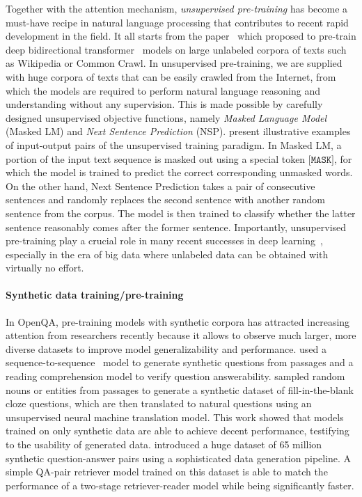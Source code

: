 %
Together with the attention mechanism, \emph{unsupervised pre-training} has become a must-have recipe in natural language processing that contributes to recent rapid development in the field.
%
It all starts from the paper~\citet{devlin2019bert} which proposed to pre-train deep bidirectional transformer~\cite{vaswani2017attention} models on large unlabeled corpora of texts such as Wikipedia or Common Crawl.
%
In unsupervised pre-training, we are supplied with huge corpora of texts that can be easily crawled from the Internet, from which the models are required to perform natural language reasoning and understanding without any supervision.
%
This is made possible by carefully designed unsupervised objective functions, namely \emph{Masked Language Model} (Masked LM) and \emph{Next Sentence Prediction} (NSP).
%
 present illustrative examples of input-output pairs of the unsupervised training paradigm.
%
In Masked LM, a portion of the input text sequence is masked out using a special token $\texttt{[MASK]}$, for which the model is trained to predict the correct corresponding unmasked words.
%
On the other hand, Next Sentence Prediction takes a pair of consecutive sentences and randomly replaces the second sentence with another random sentence from the corpus.
%
The model is then trained to classify whether the latter sentence reasonably comes after the former sentence.
%
Importantly, unsupervised pre-training play a crucial role in many recent successes in deep learning~\cite{devlin2019bert, brown2020language, caron2020unsupervised, goyal2021self}, especially in the era of big data where unlabeled data can be obtained with virtually no effort.


\paragraph{Synthetic data training/pre-training}
%
In OpenQA, pre-training models with synthetic corpora has attracted increasing attention from researchers recently because it allows to observe much larger, more diverse datasets to improve model generalizability and performance.
%
\citet{alberti2019synthetic} used a sequence-to-sequence~\cite{sutskever2014sequence} model to generate synthetic questions from passages and a reading comprehension model to verify question answerability.
%
\citet{lewis2019unsupervised} sampled random nouns or entities from passages to generate a synthetic dataset of fill-in-the-blank cloze questions, which are then translated to natural questions using an unsupervised neural machine translation model.
%
This work showed that models trained on only synthetic data are able to achieve decent performance, testifying to the usability of generated data.
%
\citet{lewis2021paq} introduced a huge dataset of 65 million synthetic question-answer pairs using a sophisticated data generation pipeline.
%
A simple QA-pair retriever model trained on this dataset is able to match the performance of a two-stage retriever-reader model while being significantly faster.
%


